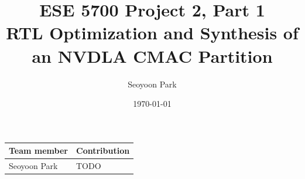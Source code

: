 \documentclass[10pt,letterpaper]{article}
\title{\textbf{ESE 5700 Project 2, Part 1}\\RTL Optimization and Synthesis of an NVDLA CMAC Partition}
\author{Seoyoon Park}
\date{\today}
\begin{document}
\maketitle

\begin{table}[H]
\centering
\begin{tabular}{ll}
\toprule
Team member & Contribution \\
\midrule
Seoyoon Park & TODO \\
\bottomrule
\end{tabular}
\end{table}




\end{document}
